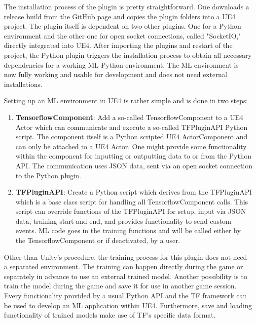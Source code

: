 \documentclass[MGS,Master,english]{twbook}%
\begin{document}
The installation process of the plugin is pretty straightforward. One downloads a release build from the GitHub page and copies the plugin folders into a \ac{UE4} project. The plugin itself is dependent on two other plugins. One for a Python environment and the other one for open socket connections, called "SocketIO," directly integrated into \ac{UE4}. After importing the plugins and restart of the project, the Python plugin triggers the installation process to obtain all necessary dependencies for a working \ac{ML} Python environment. The \ac{ML} environment is now fully working and usable for development and does not need external installations.

Setting up an \ac{ML} environment in \ac{UE4} is rather simple and is done in two steps:
\begin{enumerate}
	\item \textbf{TensorflowComponent}: Add a so-called TensorflowComponent to a \ac{UE4} Actor which can communicate and execute a so-called TFPluginAPI Python script. The component itself is a Python scripted \ac{UE4} ActorComponent and can only be attached to a \ac{UE4} Actor. One might provide some functionality within the component for inputting or outputting data to or from the Python \ac{API}. The communication uses \ac{JSON} data, sent via an open socket connection to the Python plugin.
	\item \textbf{TFPluginAPI}: Create a Python script which derives from the TFPluginAPI which is a base class script for handling all TensorflowComponent calls. This script can override functions of the TFPluginAPI for setup, input via \ac{JSON} data, training start and end, and provides functionality to send custom events. \ac{ML} code goes in the training functions and will be called either by the TensorflowComponent or if deactivated, by a user.
\end{enumerate}

Other than Unity’s procedure, the training process for this plugin does not need a separated environment. The training can happen directly during the game or separately in advance to use an external trained model. Another possibility is to train the model during the game and save it for use in another game session. Every functionality provided by a usual Python \ac{API} and the \ac{TF} framework can be used to develop an \ac{ML} application within \ac{UE4}. Furthermore, save and loading functionality of trained models make use of \ac{TF}'s specific data format.
\end{document}
